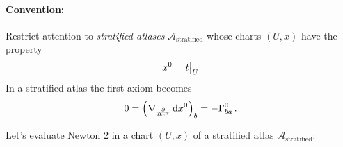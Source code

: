 \documentclass[11pt, a4paper, twocolumn]{article} %
\begin{document}
\paragraph{Convention:}
Restrict attention to \textit{stratified atlases} $\mathcal{A}_\text{stratified}$
whose charts $(U,x)$ have the property
\begin{equation}
    x^0 = t\big|_U
\end{equation}
In a stratified atlas the first axiom becomes
\begin{align}
    0 = \left( \nabla_\frac{\partial}{\partial x^a} \operatorname{d\!} x^0 \right)_b = -\Gamma^0_{ba}\,.
\end{align}

Let's evaluate Newton 2 in a chart $(U,x)$ of a stratified atlas $\mathcal{A}_\text{stratified}$:





\printbibliography[title={Bibliography}] %

\end{document}
